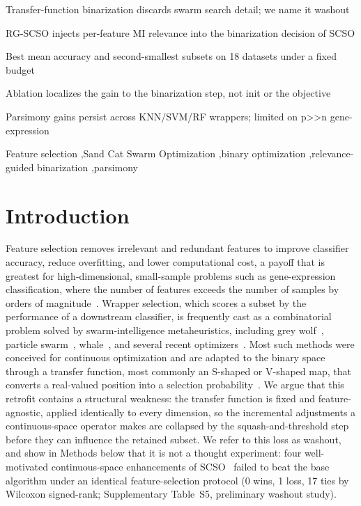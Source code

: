 \documentclass[preprint,3p,times]{elsarticle}
\begin{document}
\begin{frontmatter}
\begin{highlights}
\item Transfer-function binarization discards swarm search detail; we name it washout
\item RG-SCSO injects per-feature MI relevance into the binarization decision of SCSO
\item Best mean accuracy and second-smallest subsets on 18 datasets under a fixed budget
\item Ablation localizes the gain to the binarization step, not init or the objective
\item Parsimony gains persist across KNN/SVM/RF wrappers; limited on p>>n gene-expression
\end{highlights}

\begin{keyword}
Feature selection \sep Sand Cat Swarm Optimization \sep binary optimization \sep relevance-guided binarization \sep parsimony
\end{keyword}

\end{frontmatter}

\FloatBarrier
\section{Introduction}
Feature selection removes irrelevant and redundant features to improve
classifier accuracy, reduce overfitting, and lower computational cost, a
payoff that is greatest for high-dimensional, small-sample problems such as
gene-expression classification, where the number of features exceeds the
number of samples by orders of magnitude~\cite{guyon,mrmr}. Wrapper
selection, which scores a subset by the performance of a downstream
classifier, is frequently cast as a combinatorial problem solved by
swarm-intelligence metaheuristics, including grey wolf~\cite{bgwo}, particle
swarm~\cite{pso}, whale~\cite{mafarja}, and several recent
optimizers~\cite{aoa,coa,rime}. Most such methods were conceived for
continuous optimization and are adapted to the binary space through a
transfer function, most commonly an S-shaped or V-shaped map, that converts a
real-valued position into a selection probability~\cite{tf}. We argue that
this retrofit contains a structural weakness: the transfer function is fixed
and feature-agnostic, applied identically to every dimension, so the
incremental adjustments a continuous-space operator makes are collapsed by
the squash-and-threshold step before they can influence the retained subset.
We refer to this loss as washout, and show in Methods below that it is not a
thought experiment: four well-motivated continuous-space enhancements of
SCSO~\cite{scso} failed to beat the base algorithm under an identical
feature-selection protocol (0 wins, 1 loss, 17 ties by Wilcoxon signed-rank;
Supplementary Table~S5, preliminary washout study).
\end{document}
